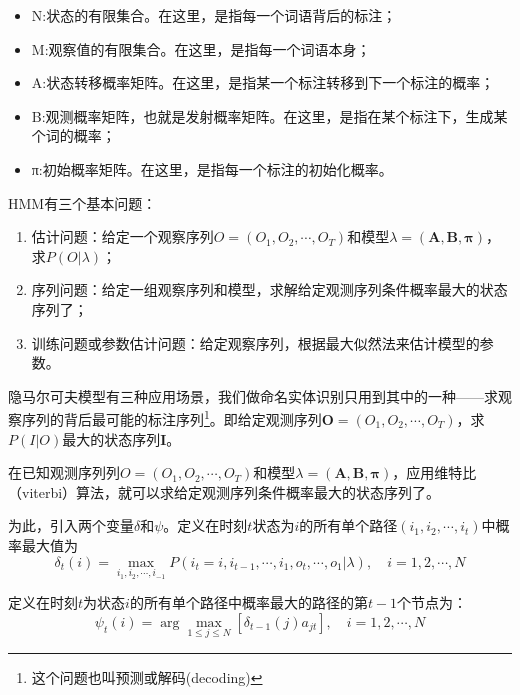 \documentclass[a4paper,UTF8,no-math]{ctexart}
\begin{document}
	
	
	\begin{itemize}
		\item N:状态的有限集合。在这里，是指每一个词语背后的标注；
		\item M:观察值的有限集合。在这里，是指每一个词语本身；
		\item A:状态转移概率矩阵。在这里，是指某一个标注转移到下一个标注的概率；
		\item B:观测概率矩阵，也就是发射概率矩阵。在这里，是指在某个标注下，生成某个词的概率；
		\item π:初始概率矩阵。在这里，是指每一个标注的初始化概率。
	\end{itemize}
	
	HMM有三个基本问题：
	
	\begin{enumerate}
		\item 估计问题：给定一个观察序列$O = (O_{1},O_{2}, \cdots ,O_{T})$和模型$\lambda=(\mathbf{A}, \mathbf{B},\mathbf{\pi})$，求$P(O | \lambda)$；
		\item 序列问题：给定一组观察序列和模型，求解给定观测序列条件概率最大的状态序列了；
		\item 训练问题或参数估计问题：给定观察序列，根据最大似然法来估计模型的参数。
	\end{enumerate}
	
	隐马尔可夫模型有三种应用场景，我们做命名实体识别只用到其中的一种——求观察序列的背后最可能的标注序列\footnote{这个问题也叫预测或解码(decoding)}。即给定观测序列$\mathbf{O} = (O_{1},O_{2}, \cdots ,O_{T})$，求$P(I|O)$最大的状态序列$\mathbf{I}$。
	
	在已知观测序列列$O = (O_{1},O_{2}, \cdots ,O_{T})$和模型$\lambda=(\mathbf{A}, \mathbf{B},\mathbf{\pi})$，应用维特比（viterbi）算法，就可以求给定观测序列条件概率最大的状态序列了。
	
	为此，引入两个变量$\delta$和$\psi$。定义在时刻$t$状态为$i$的所有单个路径$\left(i_{1}, i_{2}, \cdots, i_{t}\right)$中概率最大值为$$\delta_{t}(i)=\max _{i_{1}, i_{2}, \cdots, i_{-1}} P\left(i_{t}=i, i_{t-1}, \cdots, i_{1}, o_{t}, \cdots, o_{1} | \lambda\right), \quad i=1,2, \cdots, N$$
	
	定义在时刻$t$为状态$i$的所有单个路径中概率最大的路径的第$t-1$个节点为：$$\psi_{t}(i)=\arg \max _{1 \leq j \leqslant N}\left[\delta_{t-1}(j) a_{j t}\right], \quad i=1,2, \cdots, N$$
	
\end{document}
